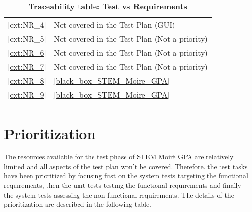 \documentclass[12pt, titlepage]{article}
\newcommand{\progname}{STEM Moir{\'e} GPA}
\begin{document}
\begin{longtable}{l p{10cm}}
\cref{ext:NR_4} & Not covered in the Test Plan (GUI)\\
\cref{ext:NR_5} & Not covered in the Test Plan (Not a priority)\\
\cref{ext:NR_6} & Not covered in the Test Plan (Not a priority)\\
\cref{ext:NR_7} & Not covered in the Test Plan (Not a priority)\\
\cref{ext:NR_8} & \cref{black_box_STEM_Moire_GPA}\\
\cref{ext:NR_9} & \cref{black_box_STEM_Moire_GPA}\\
\bottomrule
\caption{\textbf{Traceability table: Test vs Requirements}}
\label{table_traceability}
\end{longtable}

\section{Prioritization}	
The resources available for the test phase of \progname{} are relatively limited and all aspects of the test plan won't be covered. Therefore, the test tasks have been prioritized by focusing first on the system tests targeting the functional requirements, then the unit tests testing the functional requirements and finally the system tests assessing the non functional requirements. The details of the prioritization are described in the following table.
\end{document}
